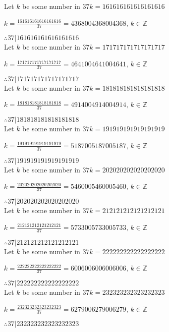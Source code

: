 \documentclass{article}
\begin{document}
Let $k$ be some number in $37k = 161616161616161616$

$k = \frac{161616161616161616}{37} = 4368004368004368$, $k \in \mathbb{Z}$

$ \therefore  37|161616161616161616 $ \\

Let $k$ be some number in $37k = 171717171717171717$

$k = \frac{171717171717171717}{37} = 4641004641004641$, $k \in \mathbb{Z}$

$ \therefore  37|171717171717171717 $ \\

Let $k$ be some number in $37k = 181818181818181818$

$k = \frac{181818181818181818}{37} = 4914004914004914$, $k \in \mathbb{Z}$

$ \therefore  37|181818181818181818 $ \\

Let $k$ be some number in $37k = 191919191919191919$

$k = \frac{191919191919191919}{37} = 5187005187005187$, $k \in \mathbb{Z}$

$ \therefore  37|191919191919191919 $ \\

Let $k$ be some number in $37k = 202020202020202020$

$k = \frac{202020202020202020}{37} = 5460005460005460$, $k \in \mathbb{Z}$

$ \therefore  37|202020202020202020 $ \\

Let $k$ be some number in $37k = 212121212121212121$

$k = \frac{212121212121212121}{37} = 5733005733005733$, $k \in \mathbb{Z}$

$ \therefore  37|212121212121212121 $ \\

Let $k$ be some number in $37k = 222222222222222222$

$k = \frac{222222222222222222}{37} = 6006006006006006$, $k \in \mathbb{Z}$

$ \therefore  37|222222222222222222 $ \\

Let $k$ be some number in $37k = 232323232323232323$

$k = \frac{232323232323232323}{37} = 6279006279006279$, $k \in \mathbb{Z}$

$ \therefore  37|232323232323232323 $ \\
\end{document}

